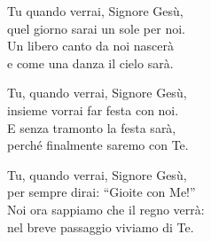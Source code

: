 
\strofa Tu quando verrai, Signore Gesù,\\
quel giorno sarai un sole per noi.\\
Un libero canto da noi nascerà\\
e come una danza il cielo sarà.

\spazio

\strofa Tu, quando verrai, Signore Gesù,\\
insieme vorrai far festa con noi.\\
E senza tramonto la festa sarà,\\
perché finalmente saremo con Te.

\spazio

\strofa Tu, quando verrai, Signore Gesù,\\
per sempre dirai: ``Gioite con Me!''\\
Noi ora sappiamo che il regno verrà:\\
nel breve passaggio viviamo di Te.
